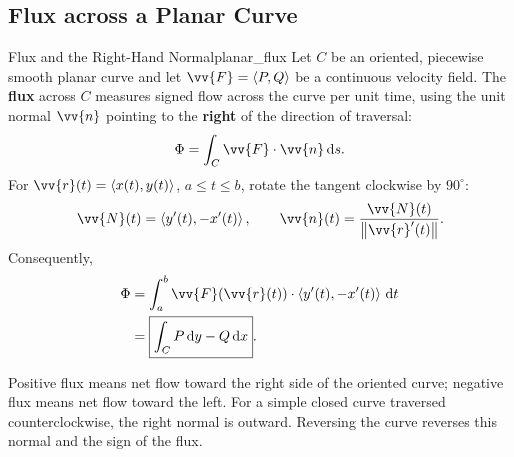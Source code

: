 \subsection{Flux across a Planar Curve}
\begin{definition}{Flux and the Right-Hand Normal}{planar_flux}
Let $C$ be an oriented, piecewise smooth planar curve and let $\vv{F} = \ang{P,Q}$ be a continuous velocity field. The \textbf{flux} across $C$ measures signed flow across the curve per unit time, using the unit normal $\vv{n}$ pointing to the \textbf{right} of the direction of traversal:
\[
    \Phi = \int_C\vv{F}\cdot\vv{n}\,\dd{s}.
\]
For $\vv{r}(t) = \ang{x(t),y(t)}$, $a \le t \le b$, rotate the tangent clockwise by $90^\circ$:
\[
    \vv{N}(t) = \ang{y'(t),-x'(t)},\qquad
    \vv{n}(t) = \frac{\vv{N}(t)}{\norm{\vv{r}'(t)}}.
\]
Consequently,
\begin{align*}
    \Phi &= \int_a^b\vv{F}(\vv{r}(t))\cdot\ang{y'(t),-x'(t)}\,\dd{t}\\
    &= \boxed{\int_C P\,\dd{y} - Q\,\dd{x}}.
\end{align*}
\end{definition}

Positive flux means net flow toward the right side of the oriented curve; negative flux means net flow toward the left. For a simple closed curve traversed counterclockwise, the right normal is outward. Reversing the curve reverses this normal and the sign of the flux.

